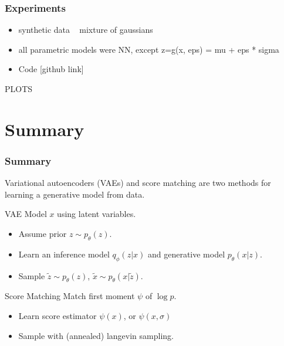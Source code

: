 \documentclass{beamer}
\begin{document}
\begin{frame}
    \frametitle{Experiments}
    \begin{itemize}
        \item synthetic data ~ mixture of gaussians
        \item all parametric models were NN, except z=g(x, eps) = mu + eps * sigma
        \item Code [github link]
    \end{itemize}
    PLOTS
\end{frame}

\section{Summary}
\begin{frame}
  \frametitle{Summary}
  Variational autoencoders (VAEs) and score matching are two methods for learning a generative model from data.
  
  \begin{block}{VAE}
    Model $x$ using latent variables.
  \end{block}
  \begin{itemize}
    \item Assume prior $z \sim p_\theta(z)$.
    \item Learn an inference model $q_\phi(z|x)$ and generative model $p_\theta(x|z)$.
    \item Sample $\tilde{z} \sim p_\theta(z)$, $\tilde{x} \sim p_\theta(x|\tilde{z})$.
  \end{itemize}
  
  \begin{block}{Score Matching}
    Match first moment $\psi$ of $\log p$.
  \end{block}
  \begin{itemize}
    \item Learn score estimator $\psi(x)$, or $\psi(x, \sigma)$
    \item Sample with (annealed) langevin sampling.
  \end{itemize}
\end{frame}
\end{document}
